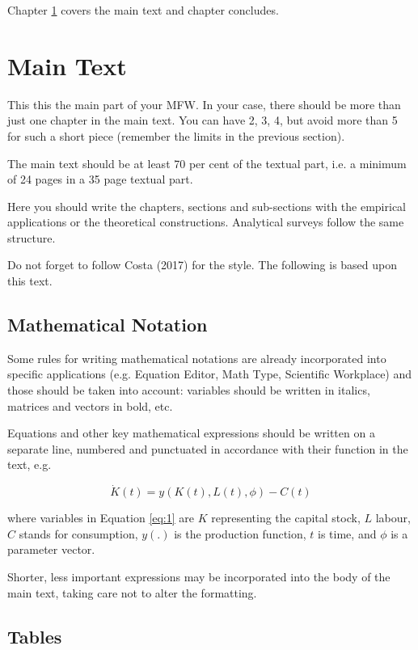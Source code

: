 \documentclass [12pt,a4paper,oneside]{article}
\begin{document}
Chapter \ref{sec:maintext} covers the main text and chapter \label{sec:conclusion} concludes.

\section{Main Text}\label{sec:maintext}

This this the main part of your MFW. In your case, there should be more than just one chapter in the main text. You can have 2, 3, 4, but avoid more than 5 for such a short piece (remember the limits in the previous section).


The main text should be at least 70 per cent of the textual part, i.e. a minimum of 24 pages in a 35 page textual part.


Here you should write the chapters, sections and sub-sections with the empirical applications or the theoretical constructions. Analytical surveys follow the same structure.


Do not forget to follow Costa (2017) for the style. The following is based upon this text.

	\subsection{Mathematical Notation}\label{subsec:mathematical}

Some rules for writing mathematical notations are already incorporated into specific applications (e.g. Equation Editor, Math Type, Scientific Workplace) and those should be taken into account: variables should be written in italics, matrices and vectors in bold, etc.

Equations and other key mathematical expressions should be written on a separate line, numbered and punctuated in accordance with their function in the text, e.g.

\begin{equation}\label{eq:1}
\dot{K}(t) = y(K(t),L(t),\phi) - C(t)
\end{equation}

where variables in Equation \ref{eq:1} are $K$ representing the capital stock, $L$ labour, $C$ stands for consumption, $y(.)$ is the production function, $t$ is time, and $\phi$ is a parameter vector.

Shorter, less important expressions may be incorporated into the body of the main text, taking care not to alter the formatting.

	\subsection{Tables}\label{subsec:tables}
\end{document}
